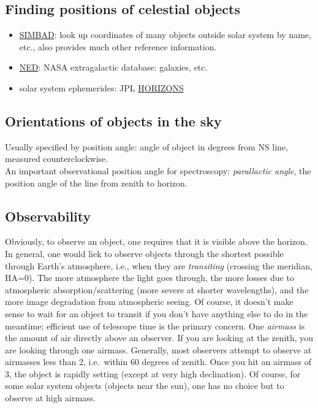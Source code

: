 \documentclass[12pt]{article}
\begin{document}
\subsection*{Finding positions of celestial objects}
\begin{itemize}
    \item \href{http://simbad.u-strasbg.fr/simbad/}{SIMBAD}:
        look up coordinates of many objects outside solar system by name, etc.,
        also provides much other reference information.
    \item \href{http://ned.ipac.caltech.edu}{NED}:
        NASA extragalactic database: galaxies, etc.
    \item solar system ephemerides: JPL
        \href{http://ssd.jpl.nasa.gov/horizons.cgi}{HORIZONS}
\end{itemize}

\subsection*{Orientations of objects in the sky}
Usually specified by position angle: angle of object in degrees from NS line,
measured counterclockwise.\\

\noindent An important observational position angle for spectroscopy:
\emph{parallactic angle}, the position angle of the line from zenith to
horizon.

\subsection*{Observability}
Obviously, to observe an object, one requires that it is visible above the
horizon. In general, one would liek to observe objects through the shortest
possible through Earth's atmosphere, i.e., when they are \emph{transiting}
(crossing the meridian, HA=0). The more atmosphere the light goes through,
the more losses due to atmospheric absorption/scattering (more severe at
shorter wavelengths), and the more image degradation from atmospheric seeing.
Of course, it doesn't make sense to wait for an object to transit if you
don't have anything else to do in the meantime; efficient use of telescope time
is the primary concern.
One \emph{airmass} is the amount of air directly above an observer.
If you are looking at the zenith, you are looking through one airmass.
Generally, most observers attempt to observe at airmasses
less than 2, i.e.\ within 60 degrees of zenith. Once you hit an airmass
of 3, the object is rapidly setting (except at very high declination).
Of course, for some solar system objects (objects near the sun), one has no
choice but to observe at high airmass.\\
\end{document}
